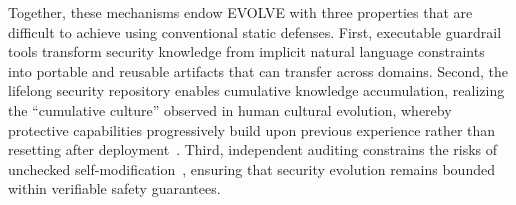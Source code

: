 Together, these mechanisms endow EVOLVE with three properties that are difficult to achieve using conventional static defenses. First, executable guardrail tools transform security knowledge from implicit natural language constraints into portable and reusable artifacts that can transfer across domains. Second, the lifelong security repository enables cumulative knowledge accumulation, realizing the ``cumulative culture'' observed in human cultural evolution, whereby protective capabilities progressively build upon previous experience rather than resetting after deployment~\citep{tomasello2009cultural}. Third, independent auditing constrains the risks of unchecked self-modification~\citep{amodei2016concrete}, ensuring that security evolution remains bounded within verifiable safety guarantees.





